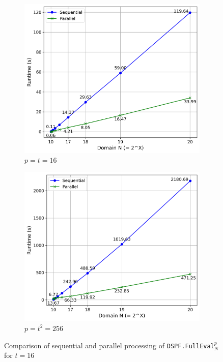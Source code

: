 \begin{figure}[t]
    \hspace{-1em}
    \begin{subfigure}[b]{0.5\textwidth}
        \centering
        \includegraphics[scale=0.49]{images/plots/full_eval_t16.png}
        \caption{$p=t=16$}
    \end{subfigure}
    \hspace{0em}
    \begin{subfigure}[b]{0.5\textwidth}
        \centering
        \includegraphics[scale=0.49]{images/plots/full_eval_t256.png}
        \caption{$p =t^2=256$}
    \end{subfigure}
    \label{fig:fullEvalChart}
    \caption{Comparison of sequential and parallel processing of \texttt{DSPF.FullEval}$_N^p$ for $t=16$}
\end{figure}

